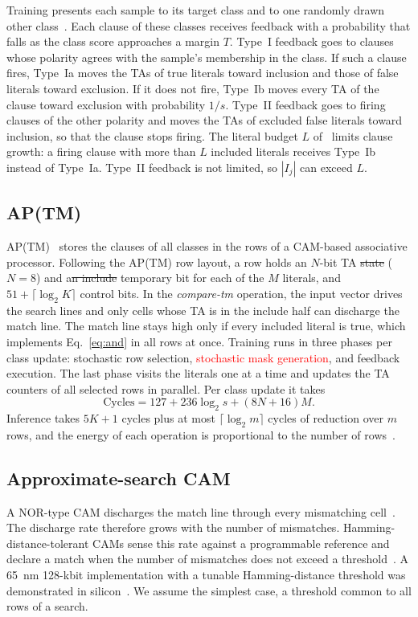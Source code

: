\documentclass[preprint,12pt,times]{elsarticle}
\newcommand{\maskred}[1]{\textcolor{red}{#1}}
\newcommand{\hadd}[1]{{\color{harel}#1}}
\newcommand{\hdel}[1]{\textcolor{harel}{\sout{#1}}}
\begin{document}
Training presents each sample to its target class and to one randomly drawn other class~\cite{granmo2018tm,pytsetlinmachine}.
Each clause of these classes receives feedback with a probability that falls as the class score approaches a margin $T$.
Type~I feedback goes to clauses whose polarity agrees with the sample's membership in the class.
If such a clause fires, Type~Ia moves the TAs of true literals toward inclusion and those of false literals toward exclusion.
If it does not fire, Type~Ib moves every TA of the clause toward exclusion with probability $1/s$.
Type~II feedback goes to firing clauses of the other polarity and moves the TAs of excluded false literals toward inclusion, so that the clause stops firing.
The literal budget $L$ of~\cite{abeyrathna2023csc} limits clause growth: a firing clause with more than $L$ included literals receives Type~Ib instead of Type~Ia.
Type~II feedback is not limited, so $|I_j|$ can exceed $L$.

\subsection{AP(TM)}
AP(TM)~\cite{shrot2026aptm} stores the clauses of all classes in the rows of a CAM-based associative processor.
Following the AP(TM) row layout, a row holds an $N$-bit TA\hdel{ state} ($N = 8$) and a\hdel{n include}\hadd{ temporary} bit for each of the $M$ literals, and $51 + \lceil \log_2 K \rceil$ control bits.
In the \emph{compare-tm} operation, the input vector drives the search lines and only cells whose TA is in the include half can discharge the match line.
The match line stays high only if every included literal is true, which implements Eq.~\eqref{eq:and} in all rows at once.
Training runs in three phases per class update: stochastic row selection, \maskred{stochastic mask generation}, and feedback execution.
The last phase visits the literals one at a time and updates the TA counters of all selected rows in parallel.
Per class update it takes~\cite{shrot2026aptm}
\begin{equation}
\mathrm{Cycles} = 127 + 236\log_2 s + (8N + 16)M .
\label{eq:aptmcycles}
\end{equation}
Inference takes $5K+1$ cycles plus at most $\lceil \log_2 m \rceil$ cycles of reduction over $m$ rows, and the energy of each operation is proportional to the number of rows~\cite{shrot2026aptm}.

\subsection{Approximate-search CAM}
A NOR-type CAM discharges the match line through every mismatching cell~\cite{pagiamtzis2006cam}.
The discharge rate therefore grows with the number of mismatches.
Hamming-distance-tolerant CAMs sense this rate against a programmable reference and declare a match when the number of mismatches does not exceed a threshold~\cite{garzon2022hdcam,jahshan2023dashcam}.
A \SI{65}{nm} 128-kbit implementation with a tunable Hamming-distance threshold was demonstrated in silicon~\cite{garzon2025jssc}.
We assume the simplest case, a threshold common to all rows of a search.
\end{document}
